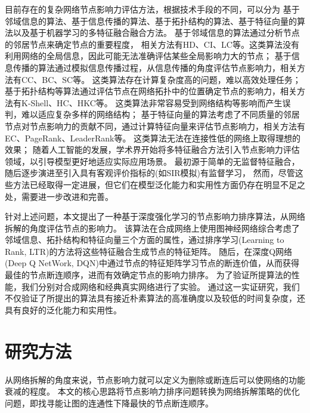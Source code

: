 \documentclass[twocolumn]{morningstar}
\begin{document}
目前存在的复杂网络节点影响力评估方法，根据技术手段的不同，可以分为
基于邻域信息的算法、基于信息传播的算法、基于拓扑结构的算法、基于特征向量的算法以及基于机器学习的多特征融合融合方法。
基于邻域信息的算法通过分析节点的邻居节点来确定节点的重要程度，
相关方法有HD\cite{albert2000HD}、CI\cite{morone2015CI}、LC\cite{chen2012LC}等。这类算法没有利用网络的全局信息，因此可能无法准确评估某些全局影响力大的节点；
基于信息传播的算法通过模拟信息传播过程，从信息传播的角度评估节点影响力，相关方法有CC\cite{sabidussi1966CC}、BC\cite{freeman1977BC}、SC\cite{estrada2005SC}等。
这类算法存在计算复杂度高的问题，难以高效处理任务\cite{barabasi2016网络科学书}；
基于拓扑结构等算法通过评估节点在网络拓扑中的位置确定节点的影响力，相关方法有K-Shell\cite{kitsak2010K-Shell}、HC\cite{lu2016H-Index}、HKC\cite{zareie2018HKC}等。
这类算法非常容易受到网络结构等影响而产生误判，难以适应复杂多样的网络结构；
基于特征向量的算法考虑了不同质量的邻居节点对节点影响力的贡献不同，通过计算特征向量来评估节点影响力，相关方法有EC\cite{bonacich1972EC}、PageRank\cite{brin1998PageRank}、LeaderRank\cite{lu2011LeaderRank}等。
这类算法无法在连接性低的网络上取得理想的效果；
随着人工智能的发展，学术界开始将多特征融合方法引入节点影响力评估领域，以引导模型更好地适应实际应用场景。
最初源于简单的无监督特征融合\cite{zhao2020无监督特征融合}，随后逐步演进至引入具有客观评价指标的(如SIR模拟)有监督学习\cite{杨洋2023有监督SIR模拟}，
然而，尽管这些方法已经取得一定进展，但它们在模型泛化能力和实用性方面仍存在明显不足之处，需要进一步改进和完善。


针对上述问题，本文提出了一种基于深度强化学习的节点影响力排序算法，从网络拆解的角度评估节点的影响力。
该算法在合成网络上使用图神经网络综合考虑了邻域信息、拓扑结构和特征向量三个方面的属性，通过排序学习(Learning to Rank, LTR)的方法将这些特征融合生成节点的特征矩阵。
随后，在深度Q网络(Deep Q NetWork, DQN)\cite{mnih2013DQN}中通过节点的特征矩阵学习节点的断连价值，从而获得最佳的节点断连顺序，进而有效确定节点的影响力排序。
为了验证所提算法的性能，我们分别对合成网络和经典真实网络进行了实验。
通过这一实证研究，我们不仅验证了所提出的算法具有接近朴素算法的高准确度以及较低的时间复杂度，还具有良好的泛化能力和实用性。


\section{研究方法}\label{sec:Methods}

从网络拆解的角度来说，节点影响力就可以定义为删除或断连后可以使网络的功能衰减的程度\cite{李天梅2019复杂网络的关键节点识别}。
本文的核心思路将节点影响力排序问题转换为网络拆解策略的优化问题，即找寻能让图的连通性下降最快的节点断连顺序。
\end{document}
